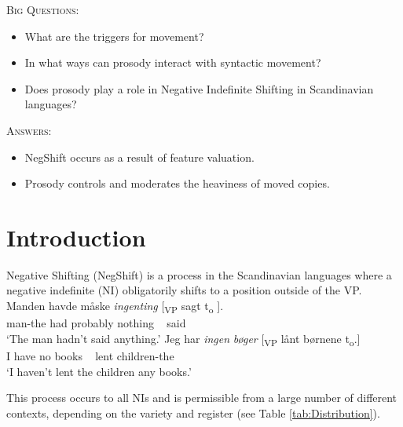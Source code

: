 \documentclass[12pt, letterpaper]{article}
\begin{document}
\begin{tcolorbox}[width=\linewidth]
\textsc{Big Questions}:
\begin{itemize}
	\item What are the triggers for movement?
	\item In what ways can prosody interact with syntactic movement?
	\item Does prosody play a role in Negative Indefinite Shifting in Scandinavian languages?
\end{itemize}
\textsc{Answers:}
\begin{itemize}
	\item NegShift occurs as a result of feature valuation. 
	\item Prosody controls and moderates the heaviness of moved copies. 
\end{itemize}
\end{tcolorbox}
\section{Introduction} \label{sec:NEGSHIFT}
\ea Negative Shifting (NegShift) is a process in the Scandinavian languages where a negative indefinite (NI) obligatorily shifts to a position outside of the VP.
	\ea
	\gll Manden havde måske \textit{ingenting} [\textsubscript{VP} sagt t\textsubscript{o} ].\\
	man-the had probably nothing ~ said\\
	\glt `The man hadn't said anything.'
	\ex 
	\gll Jeg har \textit{ingen} \textit{bøger} [\textsubscript{VP} lånt børnene t\textsubscript{o}.]\\
	I have no books ~ lent children-the\\
	\glt `I haven't lent the children any books.'
	\z

\ex This process occurs to all NIs and is permissible from a large number of different contexts, depending on the variety and register (see Table \ref{tab:Distribution}). 
\end{document}
